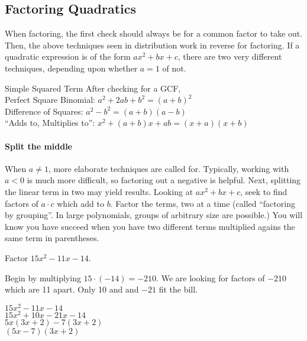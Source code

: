 \subsection{Factoring Quadratics}

When factoring, the first check should always be for a common factor to take out.  Then,
the above techniques seen in distribution work in reverse for factoring.  If a quadratic expression
is of the form $ax^2+bx+c$, there are two very different techniques, depending upon whether
$a=1$ of not.  

\begin{derivation}{Simple Squared Term}
After checking for a GCF,\\
Perfect Square Binomial: $a^2 + 2ab + b^2 = (a+b)^2$\\
Difference of Squares: $a^2 - b^2 = (a+b)(a-b)$\\
``Adds to, Multiplies to'': $x^2 + (a+b)x + ab = (x + a)(x + b)$\\
\end{derivation}

\paragraph{Split the middle}
When $a\ne1$, more elaborate techniques are called for.  Typically, working with $a<0$ is much
more difficult, so factoring out a negative is helpful.  Next, splitting the linear term in two may
yield results.  Looking at $ax^2+bx+c$, seek to find factors of $a\cdot c$ which add to $b$.  
Factor the terms, two at a time (called ``factoring by grouping''.  In large polynomials, groups of
arbitrary size are possible.)  You will know you have succeed when you have two different
terms multiplied agains the same term in parentheses.

\begin{example}
\exProblem
Factor $15x^2-11x-14$.

\exSolution
Begin by multiplying $15\cdot(-14)=-210$.  We are looking for factors of $-210$ which are 11 apart.
Only 10 and and $-21$ fit the bill.

$15x^2-11x-14$\\
$15x^2+10x-21x-14$\\
$5x(3x+2)-7(3x+2)$\\
$(5x-7)(3x+2)$
\end{example}

